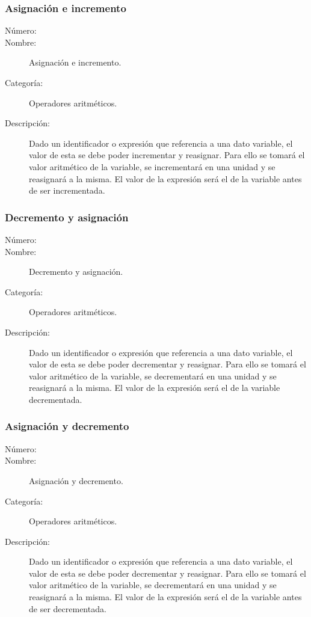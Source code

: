 \subsubsection{Asignación e incremento}
	\begin{description}
		\item [Número:] \cn
		\item [Nombre:] Asignación e incremento.
		\item [Categoría:] Operadores aritméticos.
		\item [Descripción:] Dado un identificador o expresión que referencia a una dato variable, el valor de esta se debe poder incrementar y
		reasignar. Para ello se tomará el valor aritmético de la variable, se incrementará en una unidad y se reasignará a la misma.
		El valor de la expresión será el de la variable antes de ser incrementada.
	\end {description}

\subsubsection{Decremento y asignación}
	\begin{description}
		\item [Número:] \cn
		\item [Nombre:] Decremento y asignación.
		\item [Categoría:] Operadores aritméticos.
		\item [Descripción:] Dado un identificador o expresión que referencia a una dato variable, el valor de esta se debe poder decrementar y
		reasignar. Para ello se tomará el valor aritmético de la variable, se decrementará en una unidad y se reasignará a la misma.
		El valor de la expresión será el de la variable decrementada.
	\end {description}

\subsubsection{Asignación y decremento}
	\begin{description}
		\item [Número:] \cn
		\item [Nombre:] Asignación y decremento.
		\item [Categoría:] Operadores aritméticos.
		\item [Descripción:] Dado un identificador o expresión que referencia a una dato variable, el valor de esta se debe poder decrementar y
		reasignar. Para ello se tomará el valor aritmético de la variable, se decrementará en una unidad y se reasignará a la misma.
		El valor de la expresión será el de la variable antes de ser decrementada.
	\end {description}

